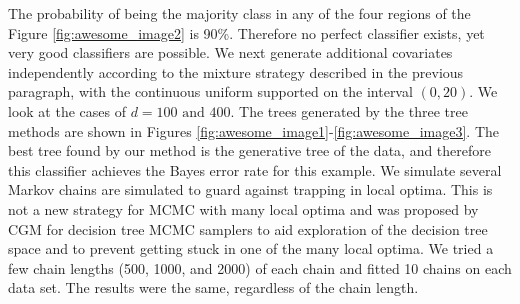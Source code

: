 The probability of being the majority class in any of the four regions of the Figure \ref{fig:awesome_image2} is 90\%. Therefore no perfect classifier exists, yet very good classifiers are possible. We next generate additional covariates independently according to the mixture strategy described in the previous paragraph, with the continuous uniform supported on the interval $(0,20)$. We look at the cases of $d=100 \text{ and } 400$. The trees generated by the three tree methods are shown in Figures \ref{fig:awesome_image1}-\ref{fig:awesome_image3}. The best tree found by our method is the generative tree of the data, and therefore this classifier achieves the Bayes error rate for this example. We simulate several Markov chains are simulated to guard against trapping in local optima. This is not a new strategy for MCMC with many local optima and was proposed by CGM \cite{chipman1998bayesian} for decision tree MCMC samplers to aid exploration of the decision tree space and to prevent getting stuck in one of the many local optima.  We tried a few chain lengths (500, 1000, and 2000) of each chain and fitted 10 chains on each data set. The results were the same, regardless of the chain length.


